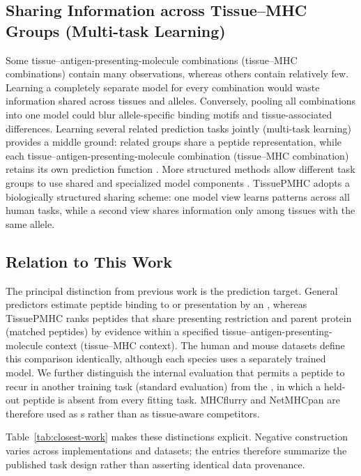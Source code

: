 \subsection{Sharing Information across Tissue--MHC Groups (Multi-task Learning)}

Some tissue--antigen-presenting-molecule combinations (tissue--MHC combinations) contain many observations, whereas others contain relatively few. Learning a completely separate model for every combination would waste information shared across tissues and alleles. Conversely, pooling all combinations into one model could blur allele-specific binding motifs and tissue-associated differences. Learning several related prediction tasks jointly (multi-task learning) provides a middle ground: related groups share a peptide representation, while each tissue--antigen-presenting-molecule combination (tissue--MHC combination) retains its own prediction function \cite{caruana1997multitask,ruder2017overview}. More structured methods allow different task groups to use shared and specialized model components \cite{ma2018mmoe,tang2020ple}. TissuePMHC adopts a biologically structured sharing scheme: one model view learns patterns across all human tasks, while a second view shares information only among tissues with the same \plainHLA{} allele.

\subsection{Relation to This Work}

The principal distinction from previous work is the prediction target. General predictors estimate peptide binding to or presentation by an \plainMHC{}, whereas TissuePMHC ranks peptides that share presenting restriction and parent protein (matched peptides) by evidence within a specified tissue--antigen-presenting-molecule context (tissue--MHC context). The human and mouse datasets define this comparison identically, although each species uses a separately trained model. We further distinguish the internal evaluation that permits a peptide to recur in another training task (standard evaluation) from the \plainPeptideOOF{}, in which a held-out peptide is absent from every fitting task. MHCflurry and NetMHCpan are therefore used as \plainGeneralPMHC{}s rather than as tissue-aware competitors.

Table~\ref{tab:closest-work} makes these distinctions explicit. Negative construction varies across implementations and datasets; the entries therefore summarize the published task design rather than asserting identical data provenance.

